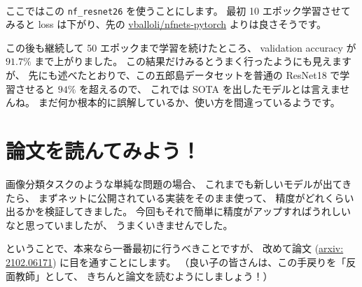 \documentclass[dvipdfmx,autodetect-engine,10pt,b5paper,papersize,openany,dvipsnames]{jsbook}
\begin{document}
\begin{multicols}{2}
\vspace{8.0cm}

ここではこの \texttt{nf\_resnet26} を使うことにします。
最初 10 エポック学習させてみると loss は下がり、先の
\href{https://github.com/vballoli/nfnets-pytorch}{vballoli/nfnets-pytorch}
よりは良さそうです。


\vspace{4.5cm}

この後も継続して 50 エポックまで学習を続けたところ、
validation accuracy が $91.7\%$ まで上がりました。
この結果だけみるとうまく行ったようにも見えますが、
先にも述べたとおりで、この五郎島データセットを普通の ResNet18 で学習させると
$94\%$ を超えるので、
これでは SOTA を出したモデルとは言えませんね。
まだ何か根本的に誤解しているか、使い方を間違っているようです。


\section{論文を読んてみよう！}
画像分類タスクのような単純な問題の場合、
これまでも新しいモデルが出てきたら、
まずネットに公開されている実装をそのまま使って、
精度がどれくらい出るかを検証してきました。
今回もそれで簡単に精度がアップすればうれしいなと思っていましたが、
うまくいきませんでした。

ということで、本来なら一番最初に行うべきことですが、
改めて論文 (\href{https://arxiv.org/abs/2102.06171}{arxiv: 2102.06171})
に目を通すことにします。
（良い子の皆さんは、この手戻りを「反面教師」として、
きちんと論文を読むようにしましょう！）


\end{multicols}
\end{document}
